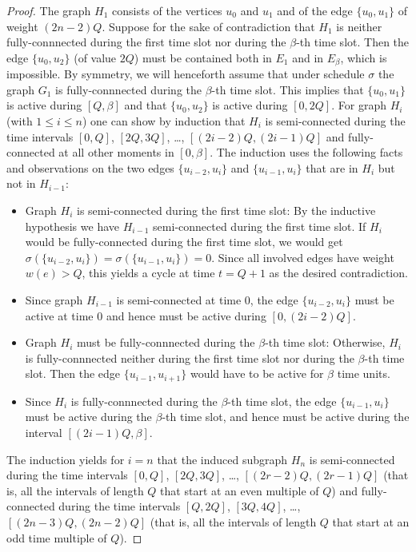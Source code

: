 \documentclass[runningheads]{llncs}
\newcommand{\set}[1]{\{ #1 \}}
\begin{document}
\begin{proof}
The graph $H_1$ consists of the vertices $u_0$ and $u_1$ and of the edge $\{u_0, u_1\}$ of weight $(2n-2)Q$.
Suppose for the sake of contradiction that $H_1$ is neither fully-connnected during the first time slot
nor during the $\beta$-th time slot.
Then the edge $\{u_0, u_2\}$ (of value $2Q$) must be contained both in $E_1$ and in $E_{\beta}$, which is impossible.
By symmetry, we will henceforth assume that under schedule $\sigma$ the graph $G_1$ is fully-connnected 
during the $\beta$-th time slot.
This implies that $\{u_0, u_1\}$ is active during $[Q,\beta]$ and that $\{u_0, u_2\}$ is active during $[0,2Q]$.
For graph $H_i$ (with $1\le i\le n$) one can show by induction that $H_i$ is semi-connected
during the time intervals $[0,Q]$, $[2Q,3Q]$, \dots, $[(2i-2)Q,(2i-1)Q]$ and fully-connected at all
other moments in $[0,\beta]$.
The induction uses the following facts and observations on the two edges $\set{u_{i-2}, u_i}$ 
and $\set{u_{i-1},u_i}$ that are in $H_i$ but not in $H_{i-1}$:
\begin{itemize}
\item Graph $H_i$ is semi-connected during the first time slot:
By the inductive hypothesis we have $H_{i-1}$ semi-connected during the first time slot.
If $H_i$ would be fully-connected during the first time slot, we would get
$\sigma(\{u_{i-2}, u_i\}) = \sigma(\{u_{i-1}, u_i\})=0$. 
Since all involved edges have weight $w(e)>Q$, this yields a cycle at time $t=Q+1$ as the desired contradiction.
\item Since graph $H_{i-1}$ is semi-connected at time $0$, the edge $\{u_{i-2},u_i\}$ must be active at 
time $0$ and hence must be active during $[0,(2i-2)Q]$.
\item Graph $H_i$ must be fully-connnected during the $\beta$-th time slot:
Otherwise, $H_i$ is fully-connnected neither during the first time slot nor during the $\beta$-th time slot. 
Then the edge $\{u_{i-1},u_{i+1}\}$ would have to be active for $\beta$ time units.
\item Since $H_i$ is fully-connnected during the $\beta$-th time slot, the edge $\{u_{i-1},u_i\}$ must be 
active during the $\beta$-th time slot, and hence must be active during the interval $[(2i-1)Q,\beta]$.
\end{itemize}
The induction yields for $i=n$ that the induced subgraph $H_n$ is semi-connected during the time intervals 
$[0,Q]$, $[2Q,3Q]$, \dots, $[(2r-2)Q,(2r-1)Q]$ (that is, all the intervals of length $Q$ that start at an even multiple of $Q$)
and fully-connected during the time intervals $[Q,2Q]$, $[3Q,4Q]$, \dots, $[(2n-3)Q,(2n-2)Q]$ (that is, all the 
intervals of length $Q$ that start at an odd time multiple of $Q$).


\end{proof}
\end{document}
